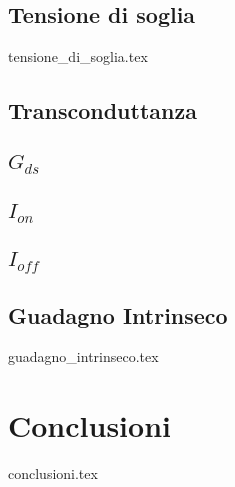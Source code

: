 \documentclass[
	a4paper,
	cleardoublepage=empty,
	headings=twolinechapter,
	numbers=autoenddot,
]{scrbook}
\begin{document}
\section{Tensione di soglia}
{tensione_di_soglia.tex}

\section[$G_{m}$]{Transconduttanza}

\section[$G_{ds}$]{$G_{ds}$}

\section[$I_{on}$]{$I_{on}$}
\section[$I_{off}$]{$I_{off}$}
\section[Guadagno Intrinseco]{Guadagno Intrinseco}
{guadagno_intrinseco.tex}

\backmatter

\chapter*{Conclusioni}
{conclusioni.tex}



\end{document}
